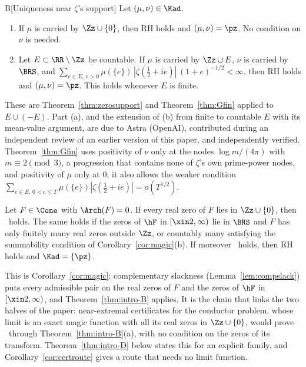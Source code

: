 \begin{lthm}{B}[Uniqueness near $\zeta$'s support]\label{thm:intro-B}
Let $(\mu,\nu)\in\Kad$.
\begin{enumerate}[label=\textup{(\alph*)}]
\item If $\mu$ is carried by $\Zz\cup\{0\}$, then RH holds and $(\mu,\nu)=\pz$. No condition on $\nu$ is needed.
\item Let $E\subset\RR\setminus\Zz$ be countable. If $\mu$ is carried by $\Zz\cup E$, $\nu$ is carried by $\BRS$, and
$\sum_{e\in E,\,e>0}\mu(\{e\})\,|\zeta(\frac12+ie)|\,(1+e)^{-1/2}<\infty$, then RH holds and $(\mu,\nu)=\pz$. This holds whenever $E$ is finite.
\end{enumerate}
\end{lthm}

These are Theorem~\ref{thm:zerosupport} and Theorem~\ref{thm:Gfin} applied to $E\cup(-E)$. Part (a), and the extension of (b) from finite to
countable $E$ with its mean-value argument, are due to Astra (OpenAI), contributed during an independent review of an earlier version of
this paper, and independently verified. Theorem~\ref{thm:Gfin} uses positivity of $\nu$ only at the nodes $\log m/(4\pi)$ with
$m\equiv2\pmod3$, a progression that contains none of $\zeta$'s own prime-power nodes, and positivity of $\mu$ only at $0$; it also allows
the weaker condition $\sum_{e\in E,\,0<e\le T}\mu(\{e\})|\zeta(\frac12+ie)|=o(T^{1/2})$.

\begin{introcor}
Let $F\in\Cone$ with $\Arch(F)=0$. If every real zero of $F$ lies in $\Zz\cup\{0\}$, then \condU\ holds. The same holds if the zeros of $\hF$
in $[\xin2,\infty)$ lie in $\BRS$ and $F$ has only finitely many real zeros outside $\Zz$, or countably many satisfying the summability
condition of Corollary~\ref{cor:magic}(b). If moreover \condE\ holds, then RH holds and $\Kad=\{\pz\}$.
\end{introcor}

This is Corollary~\ref{cor:magic}: complementary slackness (Lemma~\ref{lem:compslack}) puts every admissible pair on the real zeros of $F$ and the
zeros of $\hF$ in $[\xin2,\infty)$, and Theorem~\ref{thm:intro-B} applies. It is the chain that links the two halves of the paper:
near-extremal certificates for the conductor problem, whose limit is an exact magic function with all its real zeros in $\Zz\cup\{0\}$,
would prove \condU\ through Theorem~\ref{thm:intro-B}(a), with no condition on the zeros of its transform. Theorem~\ref{thm:intro-D} below states
this for an explicit family, and Corollary~\ref{cor:certroute} gives a route that needs no limit function.

